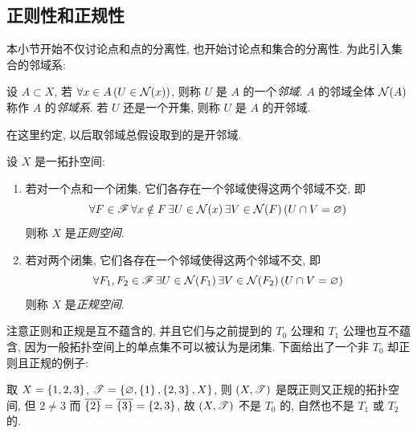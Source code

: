 \subsection{正则性和正规性}

    本小节开始不仅讨论点和点的分离性, 也开始讨论点和集合的分离性. 为此引入集合的邻域系:

    \begin{Definition}[集合的邻域系]
        设 $ A\subset X $, 若 $ \forall x\in A\,(U\in\mathcal{N}(x)) $, 则称 $ U $ 是 $ A $ 的一个\emph{邻域}. $ A $ 的邻域全体 $ \mathcal{N}(A) $ 称作 $ A $ 的\emph{邻域系}. 若 $ U $ 还是一个开集, 则称 $ U $ 是 $ A $ 的开邻域.
    \end{Definition}

    在这里约定, 以后取邻域总假设取到的是开邻域.

    \begin{Definition}
        设 $ X $ 是一拓扑空间:
        \begin{enumerate}
            \item 若对一个点和一个闭集, 它们各存在一个邻域使得这两个邻域不交, 即
            \[
                \forall F\in\mathscr{F}\,\forall x\notin F\,\exists U\in\mathcal{N}(x)\,\exists V\in\mathcal{N}(F)\,(U\cap V=\varnothing)
            \]
            则称 $ X $ 是\emph{正则空间}.
            \item 若对两个闭集, 它们各存在一个邻域使得这两个邻域不交, 即
            \[
                \forall F_1,F_2\in\mathscr{F}\,\exists U\in\mathcal{N}(F_1)\,\exists V\in\mathcal{N}(F_2)\,(U\cap V=\varnothing)
            \]
            则称 $ X $ 是\emph{正规空间}.
        \end{enumerate}
    \end{Definition}

    注意正则和正规是互不蕴含的, 并且它们与之前提到的 $ T_0 $ 公理和 $ T_1 $ 公理也互不蕴含, 因为一般拓扑空间上的单点集不可以被认为是闭集. 下面给出了一个非 $ T_0 $ 却正则且正规的例子:

    \begin{Example}
        取 $ X=\left\{ 1,2,3 \right\} $, $ \mathscr{T}=\left\{ \varnothing,\left\{ 1 \right\},\left\{ 2,3 \right\},X \right\} $, 则 $ (X,\mathscr{T}) $ 是既正则又正规的拓扑空间, 但 $ 2\ne 3 $ 而 $ \overline{\left\{ 2 \right\}}=\overline{\left\{ 3 \right\}}=\left\{ 2,3 \right\} $, 故 $ (X,\mathscr{T}) $ 不是 $ T_0 $ 的, 自然也不是 $ T_1 $ 或 $ T_2 $ 的.
    \end{Example}

